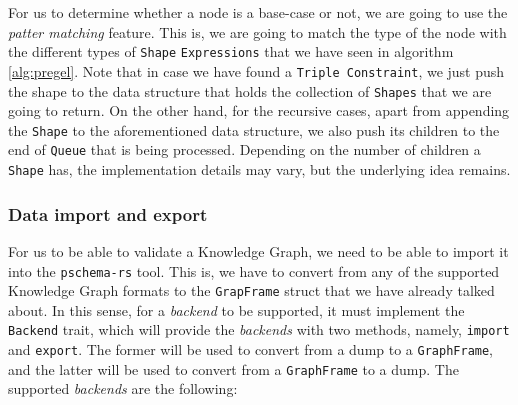\begin{code}
    \inputminted{rust}{code/listings/11-9_tree.rs}
\end{code}

For us to determine whether a node is a base-case or not, we are going to use the \textit{patter matching} feature. This is, we are going to match the type of the node with the different types of \texttt{Shape} \texttt{Expressions} that we have seen in algorithm \ref{alg:pregel}. Note that in case we have found a \texttt{Triple Constraint}, we just push the shape to the data structure that holds the collection of \texttt{Shapes} that we are going to return. On the other hand, for the recursive cases, apart from appending the \texttt{Shape} to the aforementioned data structure, we also push its children to the end of \texttt{Queue} that is being processed. Depending on the number of children a \texttt{Shape} has, the implementation details may vary, but the underlying idea remains.

\subsubsection{Data import and export}

For us to be able to validate a Knowledge Graph, we need to be able to import it into the \texttt{pschema-rs} tool. This is, we have to convert from any of the supported Knowledge Graph formats to the \texttt{GrapFrame} struct that we have already talked about. In this sense, for a \textit{backend} to be supported, it must implement the \texttt{Backend} trait, which will provide the \textit{backends} with two methods, namely, \texttt{import} and \texttt{export}. The former will be used to convert from a dump to a \texttt{GraphFrame}, and the latter will be used to convert from a \texttt{GraphFrame} to a dump. The supported \textit{backends} are the following:

